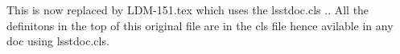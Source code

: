 This is now replaced by LDM-151.tex
which uses the lsstdoc.cls .. All the definitons in the top of this original file are in the cls file hence avilable in any doc using lsstdoc.cls. 

